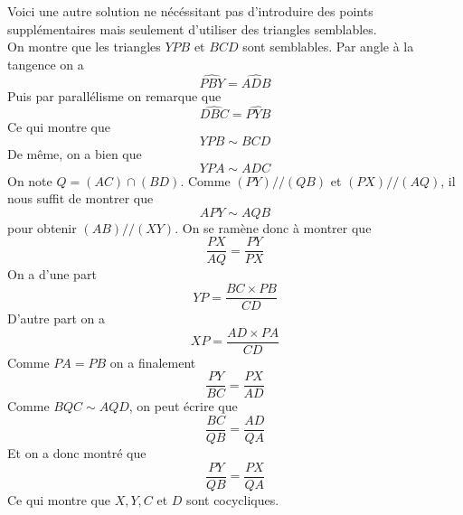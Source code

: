 \begin{sol}
\begin{center}
\end{center}

Voici une autre solution ne nécéssitant pas d'introduire des points supplémentaires mais seulement d'utiliser des triangles semblables. \\
On montre que les triangles $YPB$ et $BCD$ sont semblables. Par angle à la tangence on a
$$\widehat{PBY}=\widehat{ADB} $$
Puis par parallélisme on remarque que
$$\widehat{DBC}=\widehat{PYB} $$
Ce qui montre que
$$YPB\sim BCD $$
De même, on a bien que
$$YPA\sim ADC $$
On note $Q=(AC)\cap (BD)$.
Comme $(PY)//(QB)$ et $(PX)//(AQ)$, il nous suffit de montrer que
$$APY\sim AQB $$ pour obtenir $(AB)//(XY)$. On se ramène donc à montrer que
$$\frac{PX}{AQ}=\frac{PY}{PX} $$
On a d'une part
$$YP=\frac{BC\times PB}{CD} $$
D'autre part on a
$$XP=\frac{AD\times PA}{CD}$$
Comme $PA=PB$ on a finalement
$$\frac{PY}{BC}=\frac{PX}{AD} $$
Comme $BQC\sim AQD$, on peut écrire que
$$\frac{BC}{QB}=\frac{AD}{QA} $$
Et on a donc montré que
$$\frac{PY}{QB} =\frac{PX}{QA}$$
Ce qui montre que $X,Y,C$ et $D$ sont cocycliques.


\end{sol}
